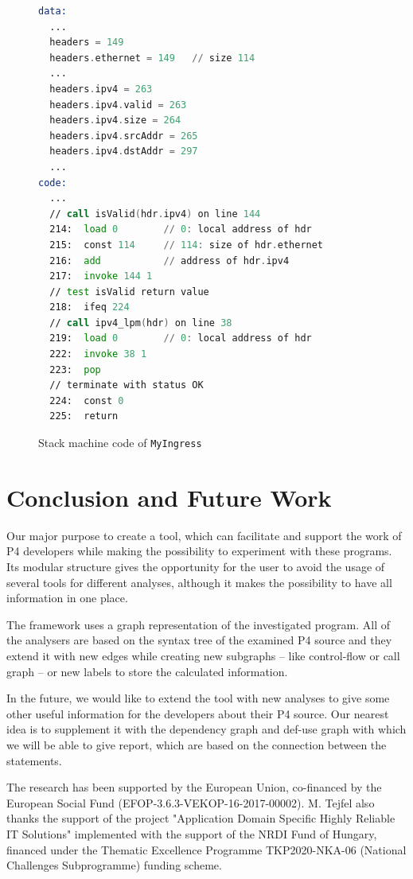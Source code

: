 \documentclass[sigconf]{acmart}
\begin{document}
  \begin{figure}
  \begin{lstlisting}[language=asm]
data:
  ...
  headers = 149 
  headers.ethernet = 149   // size 114
  ...
  headers.ipv4 = 263 
  headers.ipv4.valid = 263 
  headers.ipv4.size = 264 
  headers.ipv4.srcAddr = 265 
  headers.ipv4.dstAddr = 297
  ...
code:
  ...
  // call isValid(hdr.ipv4) on line 144
  214:  load 0	      // 0: local address of hdr
  215:  const 114     // 114: size of hdr.ethernet
  216:  add           // address of hdr.ipv4
  217:  invoke 144 1		 
  // test isValid return value
  218:  ifeq 224		 
  // call ipv4_lpm(hdr) on line 38
  219:  load 0        // 0: local address of hdr
  222:  invoke 38 1		 
  223:  pop
  // terminate with status OK
  224:  const 0		 
  225:  return 
\end{lstlisting}
\caption{Stack machine code of \texttt{MyIngress}}
  \label{code:stack}
\end{figure}
  
	\section{Conclusion and Future Work}
	
	Our major purpose to create a tool, which can facilitate and support the work of  P4 developers while making the possibility to experiment with these programs. Its modular structure gives the opportunity for the user to avoid the usage of several tools for different analyses, although it makes the possibility to have all information in one place. 
	
	The framework uses a graph representation of the investigated program. All of the analysers are based on the syntax tree of the examined P4 source and they extend it with new edges while creating new subgraphs -- like control-flow or call graph -- or new labels to store the calculated information.
	 
	In the future, we would like to extend the tool with new analyses to give some other useful information for the developers about their P4 source. Our nearest idea is to supplement it with the dependency graph and def-use graph with which we will be able to give report, which are based on the connection between the statements.		

\begin{acks}
The research has been supported by the European Union, co-financed by the European Social Fund 
(EFOP-3.6.3-VEKOP-16-2017-00002). M. Tejfel also thanks the support of the project
"Application Domain Specific Highly Reliable IT Solutions" implemented with the support of the NRDI Fund
of Hungary, financed under the Thematic Excellence Programme TKP2020-NKA-06 (National Challenges Subprogramme) funding scheme.
\end{acks}



\end{document}
